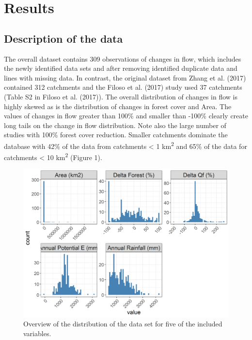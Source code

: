 \documentclass[]{elsarticle} %
\begin{document}
\hypertarget{results}{%
\section{Results}\label{results}}

\hypertarget{description-of-the-data}{%
\subsection{Description of the data}\label{description-of-the-data}}

The overall dataset contains 309 observations of changes in flow, which includes the newly identified data sets and after removing identified duplicate data and lines with missing data. In contrast, the original dataset from Zhang et al. (2017) contained 312 catchments and the Filoso et al. (2017) study used 37 catchments (Table S2 in Filoso et al. (2017)). The overall distribution of changes in flow is highly skewed as is the distribution of changes in forest cover and Area. The values of changes in flow greater than 100\% and smaller than -100\% clearly create long tails on the change in flow distribution. Note also the large number of studies with 100\% forest cover reduction. Smaller catchments dominate the database with 42\% of the data from catchments \textless{} 1 km\textsuperscript{2} and 65\% of the data for catchments \textless{} 10 km\textsuperscript{2} (Figure 1).



\begin{figure}
\includegraphics[width=0.9\linewidth]{./DataExploration} \caption{Overview of the distribution of the data set for five of the included variables.}\label{fig:datagraphs}
\end{figure}
\end{document}
